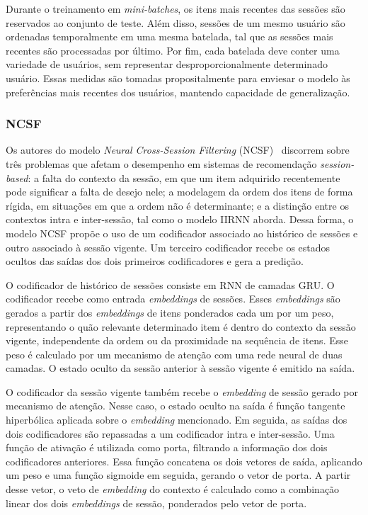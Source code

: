 Durante o treinamento em \textit{mini-batches}, os itens mais recentes das
sessões são reservados ao conjunto de teste. Além disso, sessões de um mesmo
usuário são ordenadas temporalmente em uma mesma batelada, tal que as
sessões mais recentes são processadas por último. Por fim, cada batelada
deve conter uma variedade de usuários, sem representar desproporcionalmente
determinado usuário. Essas medidas são tomadas propositalmente para enviesar o
modelo às preferências mais recentes dos usuários, mantendo capacidade de
generalização. 

\subsubsection{NCSF}
Os autores do modelo \textit{Neural Cross-Session Filtering} (NCSF)~\cite{hu2018neural} discorrem
sobre três problemas que afetam o desempenho em sistemas de recomendação
\textit{session-based}: a falta do contexto da sessão, em que um item adquirido
recentemente pode significar a falta de desejo nele; a modelagem da ordem dos
itens de forma rígida, em situações em que a ordem não é determinante; e a
distinção entre os contextos intra e inter-sessão, tal como o modelo IIRNN aborda.
Dessa forma, o modelo NCSF propõe o uso de um codificador associado ao histórico de sessões
e outro associado à sessão vigente. Um terceiro codificador recebe os estados ocultos das saídas
dos dois primeiros codificadores e gera a predição.

O codificador de histórico de sessões consiste em RNN de camadas GRU. O
codificador recebe como entrada \textit{embeddings} de sessões. Esses
\textit{embeddings} são gerados a partir dos \textit{embeddings} de itens
ponderados cada um por um peso, representando o quão relevante determinado item
é dentro do contexto da sessão vigente, independente da ordem ou da proximidade
na sequência de itens. Esse peso é calculado por um mecanismo de atenção com uma
rede neural de duas camadas. O estado oculto da sessão anterior à sessão vigente
é emitido na saída.

O codificador da sessão vigente também recebe o \textit{embedding} de sessão
gerado por mecanismo de atenção. Nesse caso, o estado oculto na saída é função
tangente hiperbólica aplicada sobre o \textit{embedding} mencionado. Em seguida,
as saídas dos dois codificadores são repassadas a um codificador intra e
inter-sessão. Uma função de ativação é utilizada como porta, filtrando a
informação dos dois codificadores anteriores. Essa função concatena os dois
vetores de saída, aplicando um peso e uma função sigmoide em seguida, gerando o
vetor de porta. A partir desse vetor, o veto de \textit{embedding} do contexto
é calculado como a combinação linear dos dois \textit{embeddings} de sessão,
ponderados pelo vetor de porta.

